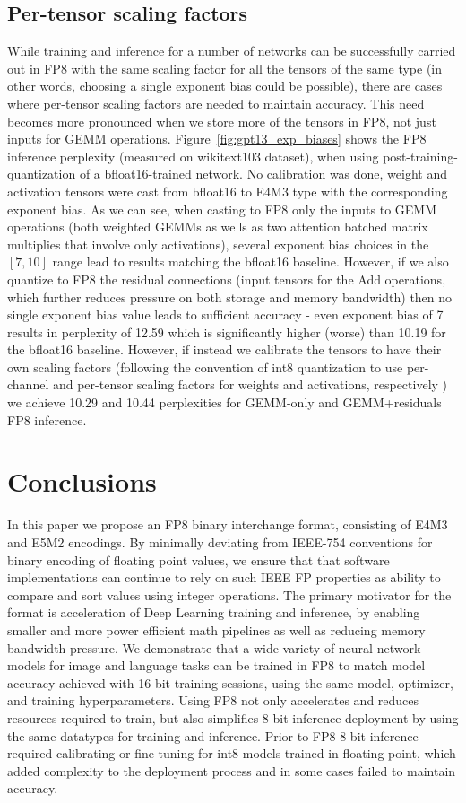 \subsection{Per-tensor scaling factors}
\label{sec:scale_granularity}
While training and inference for a number of networks can be successfully carried out in FP8 with the same scaling factor for all the tensors of the same type (in other words, choosing a single exponent bias could be possible), there are cases where per-tensor scaling factors are needed to maintain accuracy. This need becomes more pronounced when we store more of the tensors in FP8, not just inputs for GEMM operations. Figure~\ref{fig:gpt13_exp_biases} shows the FP8 inference perplexity (measured on wikitext103 dataset), when using post-training-quantization of a bfloat16-trained network. No calibration was done, weight and activation tensors were cast from bfloat16 to E4M3 type with the corresponding exponent bias. As we can see, when casting to FP8 only the inputs to GEMM operations (both weighted GEMMs as wells as two attention batched matrix multiplies that involve only activations), several exponent bias choices in the $[7, 10]$ range lead to results matching the bfloat16 baseline. However, if we also quantize to FP8 the residual connections (input tensors for the Add operations, which further reduces pressure on both storage and memory bandwidth) then no single exponent bias value leads to sufficient accuracy - even exponent bias of 7 results in perplexity of 12.59 which is significantly higher (worse) than 10.19 for the bfloat16 baseline. However, if instead  we calibrate the tensors to have their own scaling factors (following the convention of int8 quantization to use per-channel and per-tensor scaling factors for weights and activations, respectively \cite{int8_nv_2020}) we achieve 10.29 and 10.44 perplexities for GEMM-only and GEMM+residuals FP8 inference.

\section{Conclusions}
In this paper we propose an FP8 binary interchange format, consisting of E4M3 and E5M2 encodings. By minimally deviating from IEEE-754 conventions for binary encoding of floating point values, we ensure that that software implementations can continue to rely on such IEEE FP properties as ability to compare and sort values using integer operations. The primary motivator for the format is acceleration of Deep Learning training and inference, by enabling smaller and more power efficient math pipelines as well as reducing memory bandwidth pressure. We demonstrate that a wide variety of neural network models for image and language tasks can be trained in FP8 to match model accuracy achieved with 16-bit training sessions, using the same model, optimizer, and training hyperparameters. Using FP8 not only accelerates and reduces resources required to train, but also simplifies 8-bit inference deployment by using the same datatypes for training and inference. Prior to FP8 8-bit inference required calibrating or fine-tuning for int8 models trained in floating point, which added complexity to the deployment process and in some cases failed to maintain accuracy.


